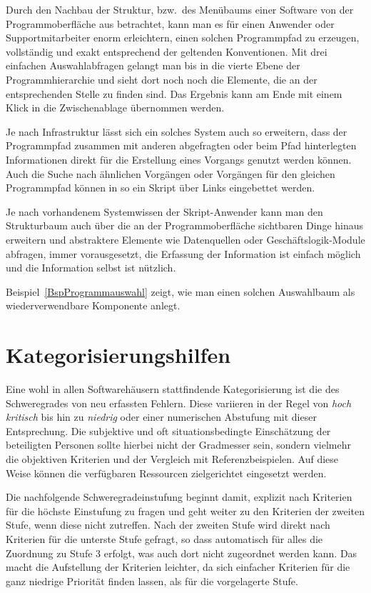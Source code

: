 Durch den Nachbau der Struktur, bzw.\ des Menübaums einer Software von der Programmoberfläche aus betrachtet, kann man es für einen Anwender oder Supportmitarbeiter enorm erleichtern, einen solchen Programmpfad zu erzeugen, vollständig und exakt entsprechend der geltenden Konventionen. Mit drei einfachen Auswahlabfragen gelangt man bis in die vierte Ebene der Programmhierarchie und sieht dort noch noch die Elemente, die an der entsprechenden Stelle zu finden sind. Das Ergebnis kann am Ende mit einem Klick in die Zwischenablage übernommen werden.

Je nach Infrastruktur lässt sich ein solches System auch so erweitern, dass der Programmpfad zusammen mit anderen abgefragten oder beim Pfad hinterlegten Informationen direkt für die Erstellung eines Vorgangs genutzt werden können. Auch die Suche nach ähnlichen Vorgängen oder Vorgängen für den gleichen Programmpfad können in so ein Skript über Links eingebettet werden.

Je nach vorhandenem Systemwissen der Skript-Anwender kann man den Strukturbaum auch über die an der Programmoberfläche sichtbaren Dinge hinaus erweitern und abstraktere Elemente wie Datenquellen oder Geschäftslogik-Module abfragen, immer vorausgesetzt, die Erfassung der Information ist einfach möglich und die Information selbst ist nützlich.

Beispiel~\ref{BspProgrammauswahl} zeigt, wie man einen solchen Auswahlbaum als wiederverwendbare Komponente anlegt.

\section{Kategorisierungshilfen}\label{Kategorisierungshilfen}
Eine wohl in allen Softwarehäusern stattfindende Kategorisierung ist die des Schweregrades von neu erfassten Fehlern. Diese variieren in der Regel von \emph{hoch kritisch} bis hin zu \emph{niedrig} oder einer numerischen Abstufung mit dieser Entsprechung. Die subjektive und oft situationsbedingte Einschätzung der beteiligten Personen sollte hierbei nicht der Gradmesser sein, sondern vielmehr die objektiven Kriterien und der Vergleich mit Referenzbeispielen. Auf diese Weise können die verfügbaren Ressourcen zielgerichtet eingesetzt werden.

Die nachfolgende Schweregradeinstufung beginnt damit, explizit nach Kriterien für die höchste Einstufung zu fragen und geht weiter zu den Kriterien der zweiten Stufe, wenn diese nicht zutreffen. Nach der zweiten Stufe wird direkt nach Kriterien für die unterste Stufe gefragt, so dass automatisch für alles die Zuordnung zu Stufe 3 erfolgt, was auch dort nicht zugeordnet werden kann. Das macht die Aufstellung der Kriterien leichter, da sich einfacher Kriterien für die ganz niedrige Priorität finden lassen, als für die vorgelagerte Stufe.

